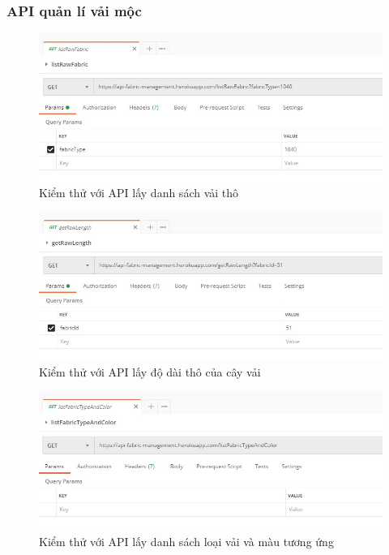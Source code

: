 \subsubsection{API quản lí vải mộc}
\begin{figure}[H]
    \begin{center}
        \includegraphics[width=12cm]{Image/API/18_listRawFabric.jpg}
        \caption{Kiểm thử với API lấy danh sách vải thô}
        \label{listRawFabric}
    \end{center}
\end{figure}
\begin{figure}[H]
    \begin{center}
        \includegraphics[width=12cm]{Image/API/19_getRawLength.jpg}
        \caption{Kiểm thử với API lấy độ dài thô của cây vải}
        \label{getRawLength}
    \end{center}
\end{figure}
\begin{figure}[H]
    \begin{center}
        \includegraphics[width=12cm]{Image/API/20_listFabricTypeAndColor.jpg}
        \caption{Kiểm thử với API lấy danh sách loại vải và màu tương ứng}
        \label{listFabricTypeAndColor}
    \end{center}
\end{figure}
